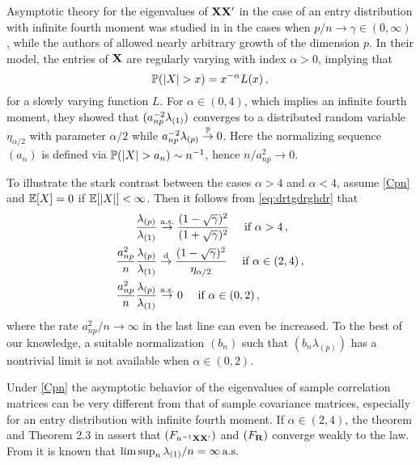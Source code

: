 Asymptotic theory for the eigenvalues of ${\mathbf X}{\mathbf X}'$ in the case of an entry distribution with infinite fourth moment was studied in \cite{soshnikov:2004,soshnikov:2006,auffinger:arous:peche:2009} in the cases when $p/n\to \gamma \in (0,\infty)$, while the authors of \cite{davis:mikosch:heiny:xie:2015,heiny:mikosch:2015:iid} allowed nearly arbitrary growth of the dimension $p$. 
In their model, the entries of ${\mathbf X}$ are regularly varying with index $\alpha>0$, implying that
\begin{equation}\label{eq:reg}
\P(|X|>x) = x^{-\alpha} L(x)\,,
\end{equation}
for a slowly varying function $L$. For $\alpha \in (0,4)$,  which implies an infinite fourth moment, they showed that $(a_{np}^{-2} \lambda_{(1)})$ converges to a \Frechet distributed random variable $\eta_{\alpha/2}$ with parameter $\alpha/2$ while $a_{np}^{-2} \lambda_{(p)}\stackrel{\mathbb{P}}{\rightarrow} 0$. Here the normalizing sequence $(a_n)$  is defined via $\P(|X|>a_n)\sim n^{-1}$, hence $n/a_{np}^{2}\to 0$. 

To illustrate the stark contrast between the cases $\alpha>4$ and $\alpha<4$, assume \eqref{Cpn} and $\mathbb{E}[X]=0$ if $\mathbb{E}[|X|]<\infty$. Then it follows from \eqref{eq:drtgdrghdr} that
\begin{equation}\label{eq:forch1}
\begin{split}
\frac{\lambda_{(p)}}{\lambda_{(1)}} &\stackrel{\rm a.s.}{\rightarrow} \frac{(1-\sqrt{\gamma})^2}{(1+\sqrt{\gamma})^2} \quad \text{ if } \alpha >4\,,\\
\frac{a_{np}^2}{n} \frac{\lambda_{(p)}}{\lambda_{(1)}} &\stackrel{\rm d}{\rightarrow} \frac{(1-\sqrt{\gamma})^2}{\eta_{\alpha/2}} \quad \text{ if } \alpha \in (2,4)\,,\\
\frac{a_{np}^2}{n} \frac{\lambda_{(p)}}{\lambda_{(1)}} &\stackrel{\rm a.s.}{\rightarrow} 0 \quad \text{ if } \alpha \in (0,2)\,,
\end{split}
\end{equation}
where the rate $a_{np}^2/n\to \infty$ in the last line can even be increased. 
To the best of our knowledge, a suitable normalization $(b_n)$ such that $(b_n \lambda_{(p)})$ has a nontrivial limit is not available when $ \alpha \in (0,2)$. 

Under \eqref{Cpn} the asymptotic behavior of the eigenvalues of sample correlation matrices can be very different from that of sample covariance matrices, especially for an entry distribution with infinite fourth moment. If $\alpha\in (2,4)$, the \MP theorem and Theorem 2.3 in \cite{bai:zhou:2008} assert that $(F_{n^{-1}{\mathbf X}{\mathbf X}'})$ and $(F_{{\mathbf R}})$  converge weakly to the \MP law. From \cite{baisilv} it is known that $\limsup_n \lambda_{(1)}/n =\infty \,{\rm a.s.}$ 
\par

